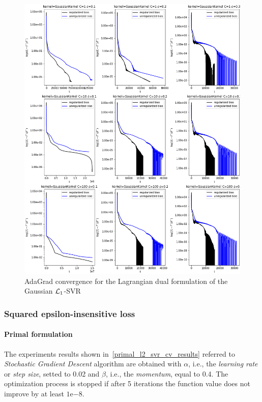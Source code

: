 \begin{figure}[H]
	\centering
	\includegraphics[scale=0.55]{img/gaussian_lagrangian_dual_l1_svr_loss_history}
	\caption{AdaGrad convergence for the Lagrangian dual formulation of the Gaussian $\protect \mathcal{L}_1$-SVR}
	\label{fig:gaussian_lagrangian_dual_l1_svr_loss_history}
\end{figure}

\pagebreak

\subsubsection{Squared epsilon-insensitive loss}

\paragraph{Primal formulation}

The experiments results shown in~\ref{primal_l2_svr_cv_results} referred to \emph{Stochastic Gradient Descent} algorithm are obtained with $\alpha$, i.e., the \emph{learning rate} or \emph{step size}, setted to 0.02 and $\beta$, i.e., the \emph{momentum}, equal to 0.4. The optimization process is stopped if after 5 iterations the function value does not improve by at least $1\mathrm{e}{-8}$.

